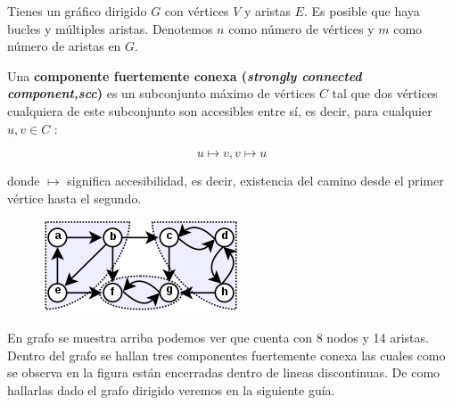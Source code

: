 Tienes un gráfico dirigido $G$ con vértices $V$ y aristas $E$. Es posible que haya bucles y múltiples aristas. Denotemos $n$ como número de vértices y $m$ como número de aristas en $G$.

Una \textbf{componente fuertemente conexa (\emph{strongly connected component,scc})} es un subconjunto máximo de vértices $C$ tal que dos vértices cualquiera de este subconjunto son accesibles entre sí, es decir, para cualquier $u, v \in C$ :

$$u \mapsto v, v \mapsto u$$

donde $\mapsto$ significa accesibilidad, es decir, existencia del camino desde el primer vértice hasta el segundo.

\begin{figure}[h!]
	\centering
	\includegraphics[width=0.4\linewidth]{img/scc}
	\label{fig:scc}
\end{figure}

En grafo se muestra arriba podemos ver que cuenta con 8 nodos y 14 aristas. Dentro del grafo se hallan tres componentes fuertemente conexa  las cuales como se observa en la figura están encerradas dentro de lineas discontinuas. De como hallarlas dado el grafo dirigido veremos en la siguiente guía. 
